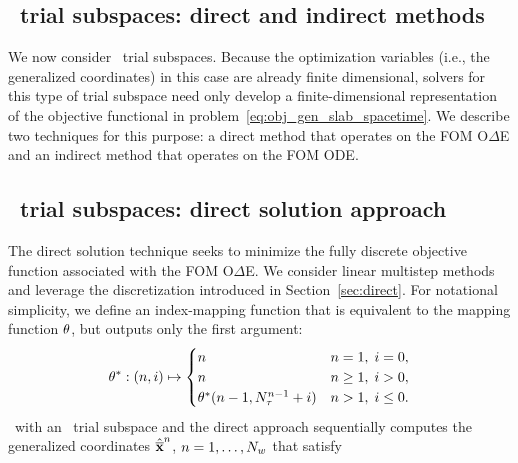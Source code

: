 \subsection{\spaceTimeAcronym\ trial subspaces: direct and indirect methods}
We now consider \spaceTimeAcronym\ trial subspaces.  Because the optimization
variables (i.e., the generalized coordinates) in this case are already finite
dimensional, solvers for this type of trial subspace need only develop a
finite-dimensional representation of the objective
functional in problem~\eqref{eq:obj_gen_slab_spacetime}. We describe two
techniques for this purpose: a direct method 
that operates on the FOM O$\Delta$E and an indirect method that operates on the FOM ODE. 

\subsection{\spaceTimeAcronym\ trial subspaces: direct solution approach}
The direct solution technique seeks to minimize the fully discrete objective
function associated with the FOM O$\Delta$E. We consider linear
multistep methods and leverage the discretization introduced in
Section~\ref{sec:direct}. For notational simplicity, we define an
index-mapping function that is equivalent to the mapping function
$\theta$, but outputs only the first argument: 
$$\theta^*: (n,i) \mapsto 
\begin{cases}
n & n = 1, \; i = 0, \\
n & n \ge 1, \; i > 0, \\
\theta^*(n-1,N_{\tau}^{n-1}+i) & n > 1, \; i \le 0.
\end{cases}$$
\methodAcronym\ with an \spaceTimeAcronym\ trial subspace and the direct approach sequentially computes the generalized coordinates $\hat{\mathbf{\overline{x}}}^{n}$, $n=1,\ldots,N_w$ that satisfy
